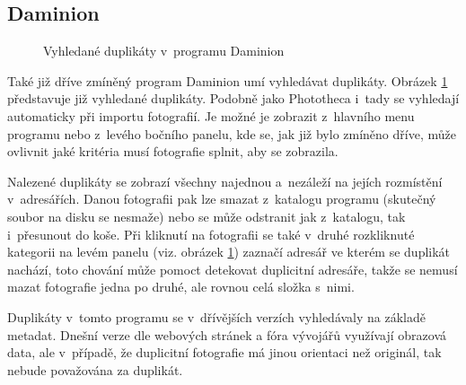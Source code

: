 \subsection*{Daminion}

\begin{figure}[h!]
\begin{center}
\caption{Vyhledané duplikáty v~programu Daminion}
\label{dami_dupl}
\end{center}
\end{figure}

Také již dříve zmíněný program Daminion umí vyhledávat duplikáty. Obrázek \ref{dami_dupl} představuje již vyhledané duplikáty. Podobně jako Phototheca i~tady se vyhledají automaticky při importu fotografií. Je možné je zobrazit z~hlavního menu programu nebo z~levého bočního panelu, kde se, jak již bylo zmíněno dříve, může ovlivnit jaké kritéria musí fotografie splnit, aby se zobrazila.


Nalezené duplikáty se zobrazí všechny najednou a~nezáleží na jejích rozmístění v~adresářích. Danou fotografii pak lze smazat z~katalogu programu (skutečný soubor na disku se nesmaže) nebo se může odstranit jak z~katalogu, tak i~přesunout do koše. Při kliknutí na fotografii se také v~druhé rozkliknuté kategorii na levém panelu (viz. obrázek \ref{dami_dupl}) zaznačí adresář ve kterém se duplikát nachází, toto chování může pomoct detekovat duplicitní adresáře, takže se nemusí mazat fotografie jedna po druhé, ale rovnou celá složka s~nimi.

Duplikáty v~tomto programu se v~dřívějších verzích vyhledávaly na základě metadat. Dnešní verze dle webových stránek a fóra vývojářů \cite{Daminion} využívají obrazová data, ale v~případě, že duplicitní fotografie má jinou orientaci než originál, tak nebude považována za duplikát.

